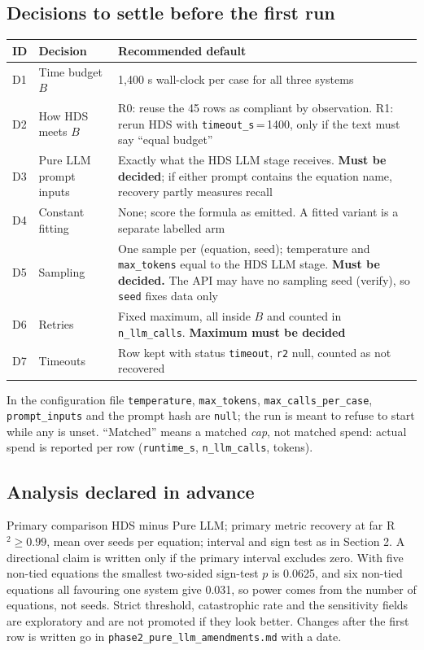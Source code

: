 \documentclass[11pt,a4paper]{article}
\newcommand{\code}[1]{\texttt{#1}}
\begin{document}
\subsection*{Decisions to settle before the first run}
\begin{table}[ht]
\centering\footnotesize
\begin{tabularx}{\textwidth}{@{}l X X@{}}
\toprule
ID & Decision & Recommended default \\
\midrule
D1 & Time budget $B$ & 1,400 s wall-clock per case for all three systems \\
D2 & How HDS meets $B$ & R0: reuse the 45 rows as compliant by observation. R1: rerun HDS with \code{timeout\_s}\,=\,1400, only if the text must say ``equal budget'' \\
D3 & Pure LLM prompt inputs & Exactly what the HDS LLM stage receives. \textbf{Must be decided}; if either prompt contains the equation name, recovery partly measures recall \\
D4 & Constant fitting & None; score the formula as emitted. A fitted variant is a separate labelled arm \\
D5 & Sampling & One sample per (equation, seed); temperature and \code{max\_tokens} equal to the HDS LLM stage. \textbf{Must be decided.} The API may have no sampling seed (verify), so \code{seed} fixes data only \\
D6 & Retries & Fixed maximum, all inside $B$ and counted in \code{n\_llm\_calls}. \textbf{Maximum must be decided} \\
D7 & Timeouts & Row kept with status \code{timeout}, \code{r2} null, counted as not recovered \\
\bottomrule
\end{tabularx}
\end{table}
In the configuration file \code{temperature}, \code{max\_tokens}, \code{max\_calls\_per\_case}, \code{prompt\_inputs} and the prompt hash are \code{null}; the run is meant to refuse to start while any is unset. ``Matched'' means a matched \emph{cap}, not matched spend: actual spend is reported per row (\code{runtime\_s}, \code{n\_llm\_calls}, tokens).

\subsection*{Analysis declared in advance}
Primary comparison HDS minus Pure LLM; primary metric recovery at far R$^2\ge0.99$, mean over seeds per equation; interval and sign test as in Section 2. A directional claim is written only if the primary interval excludes zero. With five non-tied equations the smallest two-sided sign-test $p$ is 0.0625, and six non-tied equations all favouring one system give 0.031, so power comes from the number of equations, not seeds. Strict threshold, catastrophic rate and the sensitivity fields are exploratory and are not promoted if they look better. Changes after the first row is written go in \code{phase2\_pure\_llm\_amendments.md} with a date.
\end{document}
